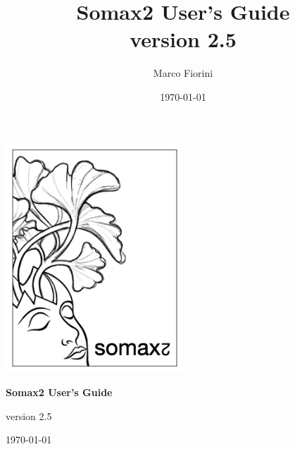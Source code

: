 \documentclass[11pt, a4paper]{report}
\title{Somax2 User's Guide\\[0.24cm]
	\large{version 2.5}}
\author{Marco Fiorini}
\date{\today}
\begin{document}
\begin{titlepage}
	\centering

\includegraphics[width=0.5\textwidth]{img/somax_logo.png}\par\vspace{1cm}

{\huge\bfseries Somax2 User's Guide\par}
\vspace{20pt}
{\large{version 2.5}}

\vfill

{\large \today\par}
\end{titlepage}


\tableofcontents







\end{document}
